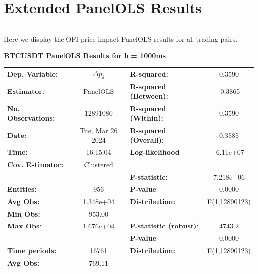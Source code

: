 
\chapter{Extended PanelOLS Results}
\hrule
\vspace{2em}
Here we display the OFI price impact PanelOLS results for all trading pairs.
\begin{table}[htbp!]
\textbf{BTCUSDT PanelOLS Results for h = 1000ms}
\begin{center}
\begin{tabular}{lclc}
\hline
\textbf{Dep. Variable:}    &         $\Delta p_{\delta}$         & \textbf{  R-squared:         }   &      0.3590      \\
\textbf{Estimator:}        &      PanelOLS      & \textbf{  R-squared (Between):}  &     -0.3865      \\
\textbf{No. Observations:} &      12891080      & \textbf{  R-squared (Within):}   &      0.3590      \\
\textbf{Date:}             &  Tue, Mar 26 2024  & \textbf{  R-squared (Overall):}  &      0.3585      \\
\textbf{Time:}             &      16:15:04      & \textbf{  Log-likelihood     }   &    -6.11e+07     \\
\textbf{Cov. Estimator:}   &     Clustered      & \textbf{                     }   &                  \\
\textbf{}                  &                    & \textbf{  F-statistic:       }   &    7.218e+06     \\
\textbf{Entities:}         &        956         & \textbf{  P-value            }   &      0.0000      \\
\textbf{Avg Obs:}          &     1.348e+04      & \textbf{  Distribution:      }   &  F(1,12890123)   \\
\textbf{Min Obs:}          &       953.00       & \textbf{                     }   &                  \\
\textbf{Max Obs:}          &     1.676e+04      & \textbf{  F-statistic (robust):} &      4743.2      \\
\textbf{}                  &                    & \textbf{  P-value            }   &      0.0000      \\
\textbf{Time periods:}     &       16761        & \textbf{  Distribution:      }   &  F(1,12890123)   \\
\textbf{Avg Obs:}          &       769.11       & \textbf{                     }   &                  \\

\end{tabular}
\end{center}
\end{table}
